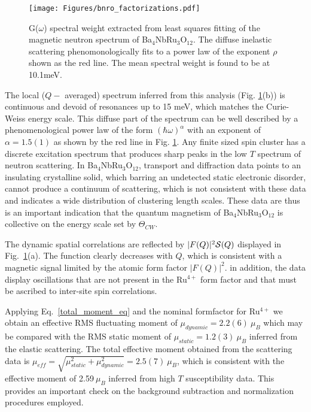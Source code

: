 \documentclass[%
 reprint,
superscriptaddress,
 amsmath,amssymb,
 aps,
 prb,
]{revtex4-2}
\begin{document}
\begin{figure}
    \texttt{[image: Figures/bnro\_factorizations.pdf]}
    \caption{G($\omega$) spectral weight extracted from least squares fitting of the magnetic neutron spectrum of Ba$_4$NbRu$_3$O$_{12}$. The diffuse inelastic scattering phenomonologically fits to a power law of the exponent $\rho$ shown as the red line. The mean spectral weight is found to be at 10.1meV. }
    \label{fig:factorizations}
\end{figure}

The local ($Q-$ averaged) spectrum inferred from this analysis (Fig. \ref{fig:factorizations}(b)) is continuous and devoid of resonances up to 15 meV, which matches the Curie-Weiss energy scale. This diffuse part of the spectrum can be well described by a phenomenological power law of the form $(\hbar\omega)^{\alpha}$ with an exponent of $\alpha =1.5(1)$ as shown by the red line in Fig. \ref{fig:factorizations}. Any finite sized spin cluster has a discrete excitation spectrum that produces sharp peaks in the low $T$ spectrum of neutron scattering. In Ba$_4$NbRu$_3$O$_{12}$, transport and diffraction data points to an insulating crystalline solid, which barring an undetected static electronic disorder, cannot produce a continuum of scattering, which is not consistent with these data and indicates a wide distribution of clustering length scales. These data are thus is an important indication that the quantum magnetism of Ba$_4$NbRu$_3$O$_{12}$ is collective on the energy scale set by $\Theta_{CW}$. 

The dynamic spatial correlations are reflected by $|F(Q)|^2{\cal S}(Q)$ displayed in Fig.~\ref{fig:factorizations}(a). The function clearly decreases with $Q$, which is consistent with a magnetic signal limited by the atomic form factor $|F(Q)|^2$. in addition, the data display oscillations that are not present in the Ru$^{4+}$  form factor  and that must be ascribed to inter-site spin correlations.

Applying Eq.~\ref{total_moment_eq} and the nominal formfactor for Ru$^{4+}$ we obtain an effective RMS fluctuating moment of $\mu_{dynamic}=2.2(6)\ \mu_B$ which may be compared with the RMS static moment of $\mu_{static}=1.2(3)~\mu_B$ inferred from the elastic scattering. The total effective moment obtained from the scattering data is $\mu_{eff}=\sqrt{\mu_{static}^2+\mu_{dynamic}^2}=2.5(7)~\mu_B$, which is consistent with the effective moment of 2.59$~\mu_B$ inferred from high $T$ susceptibility data. This provides an important check on the background subtraction and normalization procedures employed. 
\end{document}
